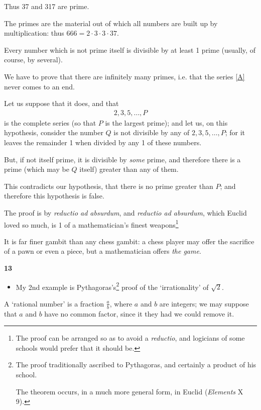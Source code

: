 \documentclass{article}
\numberwithin{equation}{section}
\begin{document}
Thus 37 and 317 are prime.

The primes are the material out of which all numbers are built up by multiplication: thus $666 = 2\cdot3\cdot3\cdot37$.

Every number which is not prime itself is divisible by at least 1 prime (usually, of course, by several).

We have to prove that there are infinitely many primes, i.e. that the series \eqref{A} never comes to an end.

%
Let us suppose that it does, and that
\begin{align*}
    2,3,5,\ldots,P
\end{align*}
is the complete series (so that $P$ is the largest prime); and let us, on this hypothesis, consider the number $Q$ is not divisible by any of $2,3,5,\ldots,P$; for it leaves the remainder 1 when divided by any 1 of these numbers.

But, if not itself prime, it is divisible by \textit{some} prime, and therefore there is a prime (which may be $Q$ itself) greater than any of them.

This contradicts our hypothesis, that there is no prime greater than $P$; and therefore this hypothesis is false.

%
The proof is by \textit{reductio ad absurdum}, and \textit{reductio ad absurdum}, which Euclid loved so much, is 1 of a mathematician's finest weapons\footnote{The proof can be arranged so as to avoid a \textit{reductio}, and logicians of some schools would prefer that it should be.}

It is far finer gambit than any chess gambit: a chess player may offer the sacrifice of a pawn or even a piece, but a mathematician offers \textit{the game}.

\begin{center}
    \large\textbf{13}
\end{center}

\begin{itemize}
    \item[2.] My 2nd example is Pythagoras's\footnote{The proof traditionally ascribed to Pythagoras, and certainly a product of his school.
    
    The theorem occurs, in a much more general form, in Euclid (\textit{Elements} X 9).} proof of the `irrationality' of $\sqrt{2}$.
\end{itemize}
A `rational number' is a fraction $\frac{a}{b}$, where $a$ and $b$ are integers; we may suppose that $a$ and $b$ have no common factor, since it they had we could remove it.
\end{document}
